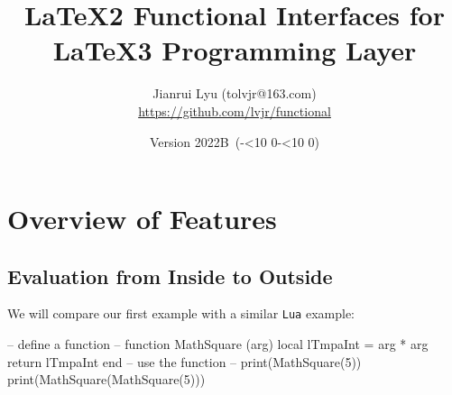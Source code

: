 \documentclass[oneside]{book}
\newcommand*{\myversion}{2022B}
\newcommand*{\mydate}{Version \myversion\ (\the\year-\mylpad\month-\mylpad\day)}
\newcommand*{\mylpad}[1]{\ifnum#1<10 0\the#1\else\the#1\fi}
\begin{document}
\title{\sffamily LaTeX2 \textcolor{green3}{Functional} Interfaces for LaTeX3 Programming Layer}
\author{Jianrui Lyu (tolvjr@163.com)\\\url{https://github.com/lvjr/functional}}
\date{\mydate\vspace{1cm}\\\myabstract\vspace{10cm}}

\newcommand\myabstract{\parbox{\linewidth}{\hrule\vspace{0.8em}\large
LaTeX3 programming layer (\textsf{expl3}) is very powerful for advanced users,
but it is a little complicated for normal users.
This \textcolor{green3}{\sffamily functional} package aims to provide
intuitive LaTeX2 functional interfaces for it.
\par\vspace{0.5em}
Although there are functions in LaTeX3, the evaluation of them is from outside to inside.
With this package, the evaluation of functions is from inside to outside,
which is the same as other programming languages such as \texttt{JavaScript} or \texttt{Lua}.
In this way, it is rather easy to debug code too.
\par\vspace{0.5em}
Note that many paragraphs in this manual are copied from the documentation of \textsf{expl3}.
\par\vspace{0.8em}\hrule}}

{\let\newpage\relax\vspace{-4cm}\maketitle}

\tableofcontents

\chapter{Overview of Features}

\section{Evaluation from Inside to Outside}

We will compare our first example with a similar \verb!Lua! example:

\begin{minipage}{0.55\textwidth}
\begin{codehigh}
\IgnoreSpacesOn
\PrgNewFunction {} {
  \IntSet {}
  \Result { \Value \lTmpaInt }
}
\IgnoreSpacesOff
{}
\end{codehigh}
\end{minipage}%
\begin{minipage}{0.45\textwidth}
\begin{code}
-- define a function --
function MathSquare (arg)
  local lTmpaInt = arg * arg
  return lTmpaInt
end
-- use the function --
print(MathSquare(5))
print(MathSquare(MathSquare(5)))
\end{code}
\end{minipage}
\end{document}
